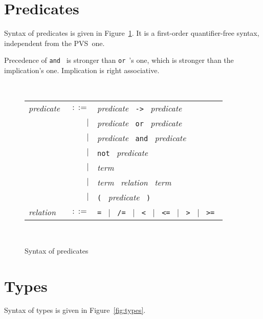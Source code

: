 \documentclass[12pt]{report}
\newcommand{\pvs}{\textsf{PVS}}
\newcommand{\te}[1]{\texttt{#1}~}
\newcommand{\nt}[1]{\textsl{#1}~}
\begin{document}
\section{Predicates}

Syntax of predicates is given in Figure~\ref{fig:predicates}.
It is a first-order quantifier-free syntax, independent from the \pvs\ one.

Precedence of \te{and} is stronger than \te{or}'s one, which is
stronger than the implication's one. Implication is right associative.

\begin{figure}[htbp]
\begin{center}
\hrulefill\\
\begin{tabular}{lrl}
  \nt{predicate}
    & $::=$ & \nt{predicate} \te{->} \nt{predicate} \\
      & $|$ & \nt{predicate} \te{or} \nt{predicate} \\
      & $|$ & \nt{predicate} \te{and} \nt{predicate} \\
      & $|$ & \te{not} \nt{predicate} \\
      & $|$ & \nt{term} \\
      & $|$ & \nt{term} \nt{relation} \nt{term} \\
      & $|$ & \te{(} \nt{predicate} \te{)}
  \\[0.1em]

  \nt{relation}
    & $::=$ & \te{=} $|$~ \te{/=} $|$~ 
              \te{<} $|$~ \te{<=} $|$~ \te{>} $|$~ \te{>=}
\end{tabular}\\
\hrulefill
\caption{Syntax of predicates}
\label{fig:predicates}
\end{center}		
\end{figure}

\section{Types}

Syntax of types is given in Figure~\ref{fig:types}.
\end{document}
